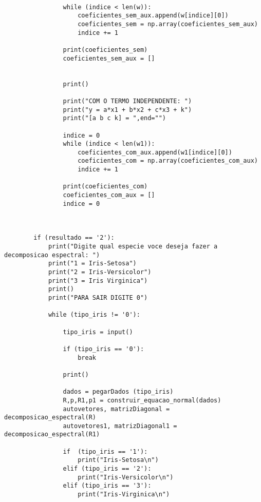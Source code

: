 \documentclass[a4paper,12pt,twoside]{article}
\begin{document}
\begin{lstlisting}
                
                while (indice < len(w)):
                    coeficientes_sem_aux.append(w[indice][0])
                    coeficientes_sem = np.array(coeficientes_sem_aux)
                    indice += 1
                
                print(coeficientes_sem)
                coeficientes_sem_aux = []
                
                    
                print()
                
                print("COM O TERMO INDEPENDENTE: ")
                print("y = a*x1 + b*x2 + c*x3 + k")
                print("[a b c k] = ",end="")
                
                indice = 0
                while (indice < len(w1)):
                    coeficientes_com_aux.append(w1[indice][0])
                    coeficientes_com = np.array(coeficientes_com_aux)
                    indice += 1
                
                print(coeficientes_com)
                coeficientes_com_aux = []  
                indice = 0
               
            
    
        if (resultado == '2'):
            print("Digite qual especie voce deseja fazer a decomposicao espectral: ")
            print("1 = Iris-Setosa")
            print("2 = Iris-Versicolor")
            print("3 = Iris Virginica")
            print()
            print("PARA SAIR DIGITE 0")
            
            while (tipo_iris != '0'):
             
                tipo_iris = input()
                
                if (tipo_iris == '0'):
                    break
                    
                print()
           
                dados = pegarDados (tipo_iris)
                R,p,R1,p1 = construir_equacao_normal(dados)
                autovetores, matrizDiagonal = decomposicao_espectral(R)
                autovetores1, matrizDiagonal1 = decomposicao_espectral(R1)
                
                if  (tipo_iris == '1'):
                    print("Iris-Setosa\n")
                elif (tipo_iris == '2'):
                    print("Iris-Versicolor\n")
                elif (tipo_iris == '3'):
                    print("Iris-Virginica\n")
                

\end{lstlisting}
\end{document}
